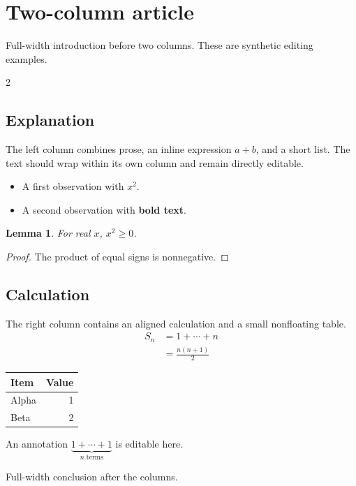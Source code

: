 \documentclass[11pt,a4paper]{article}
\newtheorem{lemma}{Lemma}
\begin{document}
\section{Two-column article}
Full-width introduction before two columns. These are synthetic editing examples.
\begin{multicols}{2}
\subsection{Explanation}
The left column combines prose, an inline expression \(a+b\), and a short list.
The text should wrap within its own column and remain directly editable.
\begin{itemize}
\item A first observation with \(x^2\).
\item A second observation with \textbf{bold text}.
\end{itemize}
\begin{lemma}For real \(x\), \(x^2\geq0\).\end{lemma}
\begin{proof}The product of equal signs is nonnegative.\end{proof}
\par\columnbreak
\subsection{Calculation}
The right column contains an aligned calculation and a small nonfloating table.
\begin{align*}
S_n&=1+\cdots+n\\
&=\frac{n(n+1)}{2}
\end{align*}
\begin{center}
\begin{tabular}{lr}\toprule Item & Value\\\midrule Alpha & 1\\Beta & 2\\\bottomrule\end{tabular}
\end{center}
An annotation \(\underbrace{1+\cdots+1}_{n\text{ terms}}\) is editable here.
\end{multicols}
Full-width conclusion after the columns.
\clearpage
\end{document}
